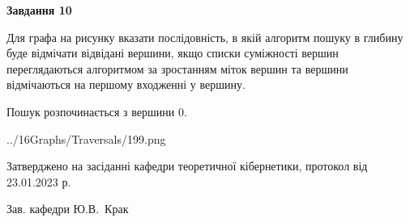\documentclass[12pt, ukrainian]{article}
\begin{document}
{\begin {large}
{\begin {center}\textbf{Завдання 10}\end {center}}\par
Для графа на рисунку вказати послідовність, в якій алгоритм пошуку в глибину буде відмічати відвідані вершини, якщо списки суміжності вершин переглядаються алгоритмом за зростанням міток вершин та вершини відмічаються на першому вход\-женні у вершину.\par
Пошук розпочинається з вершини 0.\par

\begin{center}
	{../16Graphs/Traversals/199.png}
\end{center}\par
\newpage


\end {large}
}
{\smallskip \begin {small} Затверджено на засіданні кафедри теоретичної кібернетики, протокол  від   23.01.2023 р.\par\smallskip\smallskip
{\parbox {6.5 cm}{Зав. кафедри \dotfill Ю.В.~Крак}} \end{small}}
\end{document}
